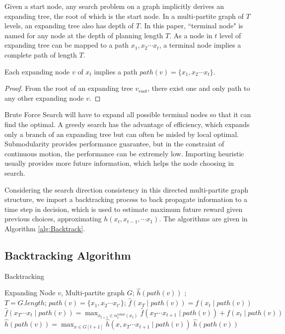 \documentclass[12pt]{article}
\begin{document}
Given a start node, any search problem on a graph implicitly derives an expanding tree, the root of which is the start node. In a multi-partite graph of $ T $ levels, an expanding tree also has depth of $ T $. In this paper, ``terminal node" is named for any node at the depth of planning length $ T $. As a node in $ t $ level of expanding tree can be mapped to a path $ x_{1}, x_{2} \cdots x_{t} $, a terminal node implies a complete path of length $ T $. 

\begin{propty}
\label{prop:path}
Each expanding node $ v $ of $ x_{t} $ implies a path $ path(v) = \{ x_{1}, x_{2} \cdots x_{t} \}  $.
\begin{proof}
From the root of an expanding tree $ v_{root} $, there exist one and only path to any other expanding node $ v $. 
\end{proof}
\end{propty}

Brute Force Search will have to expand all possible terminal nodes so that it can find the optimal. A greedy search has the advantage of efficiency, which expands only a branch of an expanding tree but can often be misled by local optimal. Submodularity provides performance guarantee, but in the constraint of continuous motion, the performance can be extremely low. Importing heuristic usually provides more future information, which helps the node choosing in search.

Considering the search direction consistency in this directed multi-partite graph structure, we import a backtracking process to back propagate information to a time step in decision, which is used to estimate maximum future reward given previous choices, approximating $ h(x_{t},  x_{t-1}, \cdots x_{1}) $. The algorithms are given in Algorithm \ref{alg:Backtrack}.

\subsection{Backtracking Algorithm}

\begin{algorithm}
\caption{Backtracking}
\label{alg:Backtrack}
\begin{algorithmic}
\REQUIRE
Expanding Node $ v $, Multi-partite graph $ G $;
\ENSURE $ \hat{h}(path(v)) $ ;\\
\STATE $ T = G.length $;
\STATE $ path(v) = \{ x_{1}, x_{2} \cdots x_{t'} \} $;
\STATE $ \hat{f}(x_{T} \mid path(v) ) = f(x_{t} \mid path(v)) $
\ELSE
\STATE $ \hat{f}(x_{T} \cdots x_{t} \mid path(v) ) = \max_{x_{t+1} \in n^{robot}_{1}(x_{t})} \hat{f}(x_{T} \cdots x_{t+1} \mid path(v) ) +  f(x_{t} \mid path(v)) $
\ENDIF
\ENDFOR
\ENDFOR
\STATE  $ \hat{h}(path(v)) = \max_{x \in G[t+1]} \hat{h}(x, x_{T} \cdots x_{t+1} \mid path(v) ) $
\RETURN $ \hat{h}(path(v))  $
\end{algorithmic}
\end{algorithm}
\end{document}
